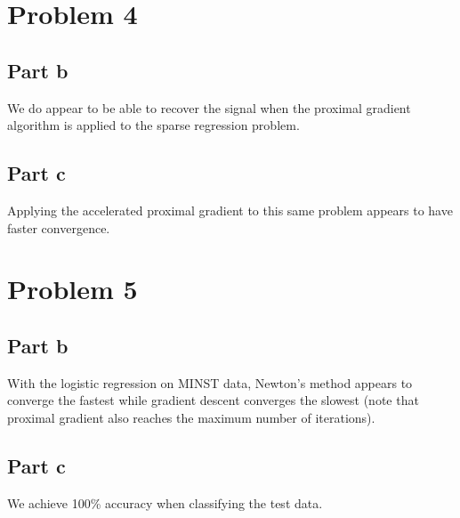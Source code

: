 \documentclass{article}
\begin{document}
\section{Problem 4} 

\subsection{Part b}
We do appear to be able to recover the signal when the proximal gradient algorithm is applied to the sparse regression problem.

\subsection{Part c}
Applying the accelerated proximal gradient to this same problem appears to have faster convergence.

\section{Problem 5}
\subsection{Part b}
With the logistic regression on MINST data, Newton's method appears to converge the fastest while gradient descent converges the slowest (note that proximal gradient also reaches the maximum number of iterations).

\subsection{Part c}
We achieve 100\% accuracy when classifying the test data.
\end{document}
